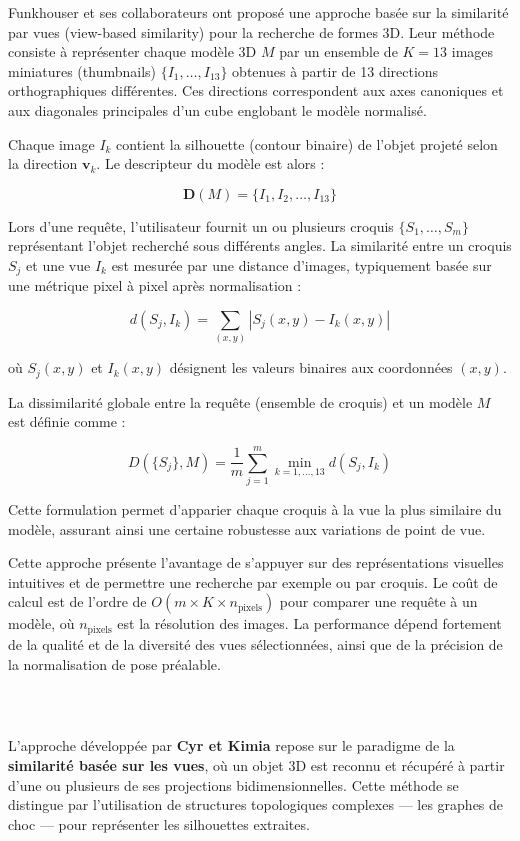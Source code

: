 \documentclass[11pt,a4paper,oneside]{report}
\begin{document}
Funkhouser et ses collaborateurs ont proposé une approche basée sur la similarité par vues (view-based similarity) pour la recherche de formes 3D. Leur méthode consiste à représenter chaque modèle 3D $M$ par un ensemble de $K = 13$ images miniatures (thumbnails) $\{I_1, \ldots, I_{13}\}$ obtenues à partir de 13 directions orthographiques différentes. Ces directions correspondent aux axes canoniques et aux diagonales principales d'un cube englobant le modèle normalisé.

Chaque image $I_k$ contient la silhouette (contour binaire) de l'objet projeté selon la direction $\mathbf{v}_k$. Le descripteur du modèle est alors :

$$\mathbf{D}(M) = \{I_1, I_2, \ldots, I_{13}\}$$

Lors d'une requête, l'utilisateur fournit un ou plusieurs croquis $\{S_1, \ldots, S_m\}$ représentant l'objet recherché sous différents angles. La similarité entre un croquis $S_j$ et une vue $I_k$ est mesurée par une distance d'images, typiquement basée sur une métrique pixel à pixel après normalisation :

$$d(S_j, I_k) = \sum_{(x,y)} |S_j(x,y) - I_k(x,y)|$$

où $S_j(x,y)$ et $I_k(x,y)$ désignent les valeurs binaires aux coordonnées $(x,y)$.

La dissimilarité globale entre la requête (ensemble de croquis) et un modèle $M$ est définie comme :

$$D(\{S_j\}, M) = \frac{1}{m} \sum_{j=1}^m \min_{k=1,\ldots,13} d(S_j, I_k)$$

Cette formulation permet d'apparier chaque croquis à la vue la plus similaire du modèle, assurant ainsi une certaine robustesse aux variations de point de vue.

Cette approche présente l'avantage de s'appuyer sur des représentations visuelles intuitives et de permettre une recherche par exemple ou par croquis. Le coût de calcul est de l'ordre de $O(m \times K \times n_{\text{pixels}})$ pour comparer une requête à un modèle, où $n_{\text{pixels}}$ est la résolution des images. La performance dépend fortement de la qualité et de la diversité des vues sélectionnées, ainsi que de la précision de la normalisation de pose préalable.


\subsubsection{~\cite{cyr32}}

L'approche développée par \textbf{Cyr et Kimia} repose sur le paradigme de la \textbf{similarité basée sur les vues}, où un objet 3D est reconnu et récupéré à partir d'une ou plusieurs de ses projections bidimensionnelles. Cette méthode se distingue par l'utilisation de structures topologiques complexes --- les graphes de choc --- pour représenter les silhouettes extraites.
\end{document}

